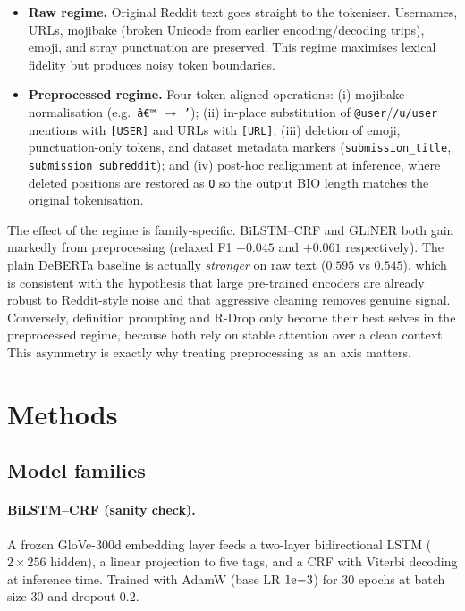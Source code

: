 \documentclass[11pt]{article}
\begin{document}
\begin{itemize}
\itemsep0em
\item \textbf{Raw regime.} Original Reddit text goes straight to the
tokeniser. Usernames, URLs, mojibake (broken Unicode from earlier
encoding/decoding trips), emoji, and stray punctuation are preserved.
This regime maximises lexical fidelity but produces noisy token
boundaries.
\item \textbf{Preprocessed regime.} Four token-aligned operations: (i)
mojibake normalisation (e.g.\ \texttt{â€™} $\to$ \texttt{'}); (ii)
in-place substitution of \texttt{@user}/\texttt{/u/user} mentions with
\texttt{[USER]} and URLs with \texttt{[URL]}; (iii) deletion of emoji,
punctuation-only tokens, and dataset metadata markers
(\texttt{submission\_title}, \texttt{submission\_subreddit}); and (iv)
post-hoc realignment at inference, where deleted positions are restored
as \texttt{O} so the output BIO length matches the original
tokenisation.
\end{itemize}

The effect of the regime is family-specific. BiLSTM--CRF and GLiNER both
gain markedly from preprocessing (relaxed F1 $+0.045$ and $+0.061$
respectively). The plain DeBERTa baseline is actually \emph{stronger} on
raw text ($0.595$ vs $0.545$), which is consistent with the hypothesis
that large pre-trained encoders are already robust to Reddit-style noise
and that aggressive cleaning removes genuine signal. Conversely,
definition prompting and R-Drop only become their best selves in the
preprocessed regime, because both rely on stable attention over a clean
context. This asymmetry is exactly why treating preprocessing as an
axis matters.

\section{Methods}
\label{sec:methods}

\subsection{Model families}
\label{sec:models}

\paragraph{BiLSTM--CRF (sanity check).} A frozen GloVe-300d embedding
layer feeds a two-layer bidirectional LSTM ($2{\times}256$ hidden),
a linear projection to five tags, and a CRF with Viterbi decoding at
inference time. Trained with AdamW (base LR $1{\rm e}{-3}$) for $30$
epochs at batch size $30$ and dropout $0.2$.
\end{document}
